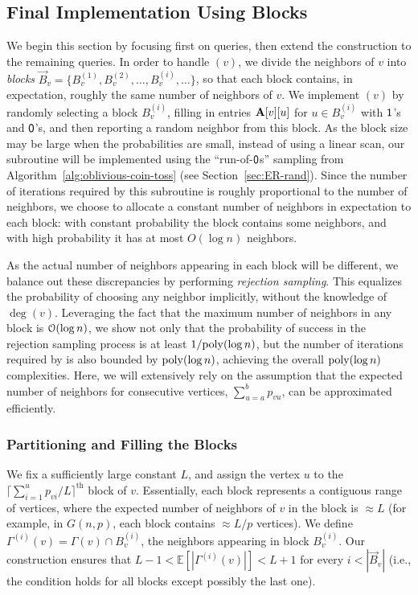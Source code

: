 \subsection{Final Implementation Using Blocks}
\label{sec:blocks}
We begin this section by focusing first on  queries, then extend the construction to the remaining queries.
In order to handle $(v)$, we divide the neighbors of $v$ into \emph{blocks}
$\vec B_v = \{ B^{(1)}_v, B^{(2)}_v, \ldots, B^{(i)}_v, \ldots\}$,
so that each block contains, in expectation, roughly the same number of neighbors of $v$.
We implement $(v)$ by randomly selecting a block $B^{(i)}_v$,
filling in entries $\mathbf{A}[v][u]$ for $u \in B^{(i)}_v$ with $\mathsf{1}$'s and $\mathsf{0}$'s, and then reporting a random neighbor from this block.
As the block size may be large when the probabilities are small, instead of using a linear scan,
our  subroutine will be implemented using the ``run-of-$\mathsf{0}$s'' sampling from  Algorithm~\ref{alg:oblivious-coin-toss}
(see Section~\ref{sec:ER-rand}).
Since the number of iterations required by this subroutine is roughly proportional to the number of neighbors,
we choose to allocate a constant number of neighbors in expectation to each block:
with constant probability the block contains some neighbors, and with high probability it has at most $O(\log n)$ neighbors.

As the actual number of neighbors appearing in each block will be different,
we balance out these discrepancies by performing \emph{rejection sampling}.
This equalizes the probability of choosing any neighbor implicitly, without the knowledge of $\deg(v)$.
Leveraging the fact that the maximum number of neighbors in any block is $\Bo(\log n)$,
we show not only that the probability of success in the rejection sampling process is at least $1/\mathrm{poly}(\log n)$,
but the number of iterations required by  is also bounded by $\mathrm{poly}(\log n)$, achieving the overall $\mathrm{poly}(\log n)$ complexities.
Here, we will extensively rely on the assumption that the expected number of neighbors for consecutive vertices,
$\sum_{u=a}^b p_{vu}$, can be approximated efficiently.

\subsubsection{Partitioning and Filling the Blocks}
\label{sec:block_partitioning_and_filling}
We fix a sufficiently large constant $L$, and assign the vertex $u$ to the $\lceil\sum^{u}_{i=1} p_{vi}/L\rceil^\textrm{th}$ block of $v$.
Essentially, each block represents a contiguous range of vertices, where the expected number of neighbors of $v$ in the block is $\approx L$
(for example, in $G(n,p)$, each block contains $\approx L/p$ vertices).
We define $\Gamma^{(i)}(v) = \Gamma(v) \cap B^{(i)}_v$, the neighbors appearing in block $B^{(i)}_v$.
Our construction ensures that $L-1 < \mathbb E \left[|\Gamma^{(i)}(v)|\right] < L+1$ for every $i < |\vec B_v|$
(i.e., the condition holds for all blocks except possibly the last one).

